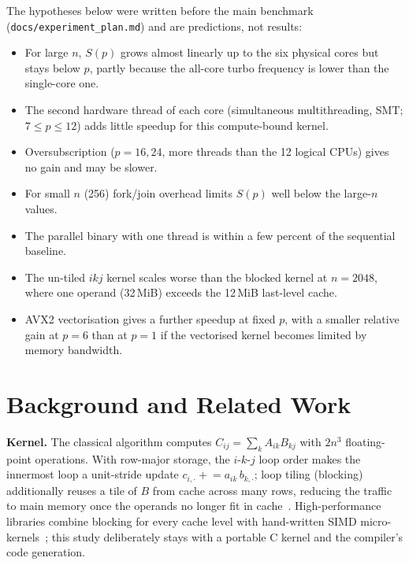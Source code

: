 \documentclass[conference,a4paper]{IEEEtran}
\begin{document}
The hypotheses below were written before the main benchmark (\texttt{docs/experiment\_plan.md}) and
are predictions, not results:
\begin{itemize}
\item[\textbf{H1}] For large $n$, $S(p)$ grows almost linearly up to the six physical cores but stays
  below $p$, partly because the all-core turbo frequency is lower than the single-core one.
\item[\textbf{H2}] The second hardware thread of each core (simultaneous multithreading, SMT;
  $7\le p\le 12$) adds little speedup for this compute-bound kernel.
\item[\textbf{H3}] Oversubscription ($p=16,24$, more threads than the 12 logical CPUs) gives no gain
  and may be slower.
\item[\textbf{H4}] For small $n$ (256) fork/join overhead limits $S(p)$ well below the large-$n$ values.
\item[\textbf{H5}] The parallel binary with one thread is within a few percent of the sequential baseline.
\item[\textbf{H6}] The un-tiled $ikj$ kernel scales worse than the blocked kernel at $n=2048$, where one
  operand (32\,MiB) exceeds the 12\,MiB last-level cache.
\item[\textbf{H7}] AVX2 vectorisation gives a further speedup at fixed $p$, with a smaller relative gain at
  $p=6$ than at $p=1$ if the vectorised kernel becomes limited by memory bandwidth.
\end{itemize}

\section{Background and Related Work}
\label{sec:background}
\textbf{Kernel.} The classical algorithm computes $C_{ij}=\sum_k A_{ik}B_{kj}$ with $2n^3$
floating-point operations. With row-major storage, the $i$-$k$-$j$ loop order makes the innermost loop
a unit-stride update $c_{i,\cdot}\mathrel{+}=a_{ik}\,b_{k,\cdot}$; loop tiling (blocking) additionally
reuses a tile of $B$ from cache across many rows, reducing the traffic to main memory once the
operands no longer fit in cache~\cite{lam1991}. High-performance libraries combine blocking for every
cache level with hand-written SIMD micro-kernels~\cite{goto2008}; this study deliberately stays with a
portable C kernel and the compiler's code generation.
\end{document}
